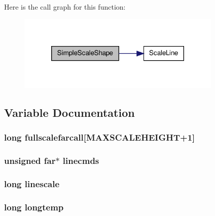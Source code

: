 Here is the call graph for this function:
\nopagebreak
\begin{figure}[H]
\begin{center}
\leavevmode
\includegraphics[width=276pt]{OLDSCALE_8C_a11d04052928f61aec9102f6cce71fadb_cgraph}
\end{center}
\end{figure}




\subsection{Variable Documentation}
\hypertarget{OLDSCALE_8C_a4b3db832e1c51c7a13e5e973de3115b3}{
\subsubsection[{fullscalefarcall}]{\setlength{\rightskip}{0pt plus 5cm}long {\bf fullscalefarcall}\mbox{[}MAXSCALEHEIGHT+1\mbox{]}}}
\label{OLDSCALE_8C_a4b3db832e1c51c7a13e5e973de3115b3}
\hypertarget{OLDSCALE_8C_aa68026c177907246bf15db85bc76f61c}{
\subsubsection[{linecmds}]{\setlength{\rightskip}{0pt plus 5cm}unsigned far$\ast$ {\bf linecmds}}}
\label{OLDSCALE_8C_aa68026c177907246bf15db85bc76f61c}
\hypertarget{OLDSCALE_8C_ab632e78b4009b275cfa1629ac26b4be1}{
\subsubsection[{linescale}]{\setlength{\rightskip}{0pt plus 5cm}long {\bf linescale}}}
\label{OLDSCALE_8C_ab632e78b4009b275cfa1629ac26b4be1}
\hypertarget{OLDSCALE_8C_ab21e1dd6476595095fa335682b93094e}{
\subsubsection[{longtemp}]{\setlength{\rightskip}{0pt plus 5cm}long {\bf longtemp}}}
